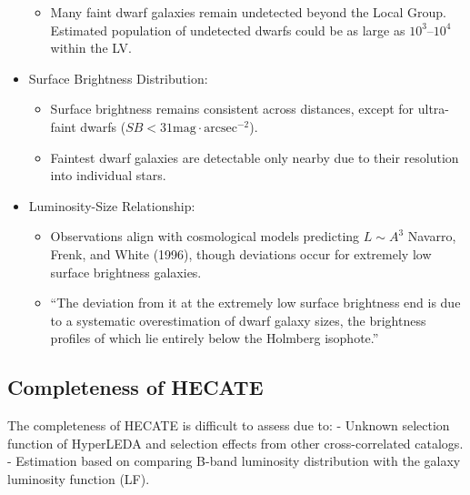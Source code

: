 \documentclass[
]{article}
\providecommand{\tightlist}{%
  \setlength{\itemsep}{0pt}\setlength{\parskip}{0pt}}\usepackage{longtable,booktabs,array}
\begin{document}
\begin{itemize}
  \begin{itemize}
  \tightlist
  \item
    Many faint dwarf galaxies remain undetected beyond the Local Group.
    Estimated population of undetected dwarfs could be as large as
    \(10^3–10^4\) within the LV.
  \end{itemize}
\item
  Surface Brightness Distribution:

  \begin{itemize}
  \tightlist
  \item
    Surface brightness remains consistent across distances, except for
    ultra-faint dwarfs (\(SB <31 \text{mag}\cdot\text{arcsec}^{-2}\)).
  \item
    Faintest dwarf galaxies are detectable only nearby due to their
    resolution into individual stars.
  \end{itemize}
\item
  Luminosity-Size Relationship:

  \begin{itemize}
  \tightlist
  \item
    Observations align with cosmological models predicting \(L\sim A^3\)
    Navarro, Frenk, and White (1996), though deviations occur for
    extremely low surface brightness galaxies.
  \item
    ``The deviation from it at the extremely low surface brightness end
    is due to a systematic overestimation of dwarf galaxy sizes, the
    brightness profiles of which lie entirely below the Holmberg
    isophote.''
  \end{itemize}
\end{itemize}

\subsection{Completeness of HECATE}\label{completeness-of-hecate}

The completeness of HECATE is difficult to assess due to: - Unknown
selection function of HyperLEDA and selection effects from other
cross-correlated catalogs. - Estimation based on comparing B-band
luminosity distribution with the galaxy luminosity function (LF).
\end{document}
